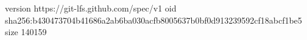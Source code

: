version https://git-lfs.github.com/spec/v1
oid sha256:b430473704b41686a2ab6ba030acfb8005637b0bf0d913239592cf18abcf1be5
size 140159
